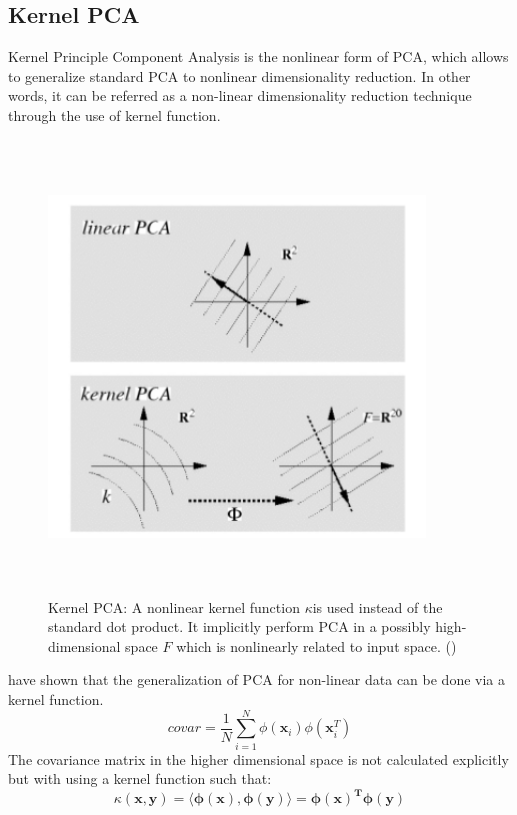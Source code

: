 \subsection{Kernel PCA}
Kernel Principle Component Analysis is the nonlinear form of PCA, which allows to generalize standard PCA to nonlinear dimensionality reduction. In other words, it can be referred as a non-linear dimensionality reduction technique through the use of kernel function. 
\begin{figure}
	\centering
	\includegraphics[width=10cm,height=12cm,keepaspectratio]{files/kernelPCA.png}
	\caption{ Kernel PCA: A nonlinear kernel function $\kappa$is used instead of the standard dot product. It implicitly perform PCA in a  possibly high-dimensional space $ F $ which is  nonlinearly related to input space. (\cite{scholkopf1997kernel})}
	\label{fig:kpca}
\end{figure}
\cite{scholkopf1997kernel} have shown that the generalization of PCA for non-linear data can be done via a kernel function.
\begin{equation}
covar = \dfrac{1}{N}\sum_{i=1}^{N}\phi(\mathbf{x}_i)\phi(\mathbf{x}_i^T)
\end{equation}
The covariance matrix in the higher dimensional space is not calculated explicitly but with using a kernel function such that: 
\begin{equation}
\kappa(\mathbf{x},\mathbf{y}) = \mathbf{\langle\phi(x),\phi(y)\rangle} =  \mathbf{\phi(x)^{T}\phi(y)}
\end{equation}
